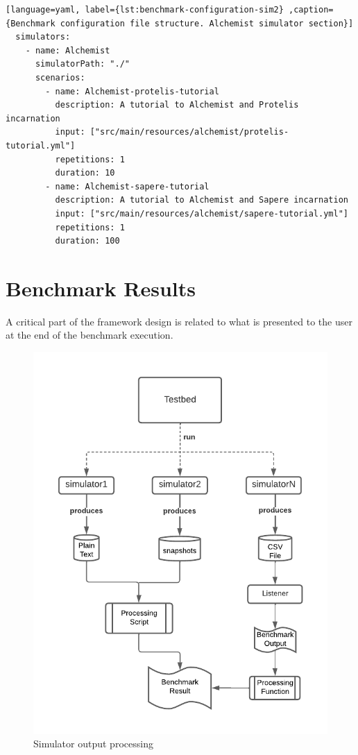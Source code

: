 \documentclass[12pt,a4paper,openright,twoside]{book}
\begin{document}
\begin{lstlisting}[language=yaml, label={lst:benchmark-configuration-sim2} ,caption={Benchmark configuration file structure. Alchemist simulator section}]
  simulators:
    - name: Alchemist
      simulatorPath: "./"
      scenarios:
        - name: Alchemist-protelis-tutorial
          description: A tutorial to Alchemist and Protelis incarnation
          input: ["src/main/resources/alchemist/protelis-tutorial.yml"]
          repetitions: 1
          duration: 10
        - name: Alchemist-sapere-tutorial
          description: A tutorial to Alchemist and Sapere incarnation
          input: ["src/main/resources/alchemist/sapere-tutorial.yml"]
          repetitions: 1
          duration: 100
  \end{lstlisting}

\section{Benchmark Results}

A critical part of the framework design is related to what is presented to the user at the end of the benchmark execution.

\begin{figure}[h!]
  \centering
  \includegraphics[width=\textwidth]{figures/output-processing.pdf}
  \caption{Simulator output processing}
  \label{fig:output}
\end{figure}
\end{document}
